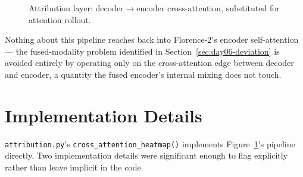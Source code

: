 \begin{figure}[h]
\centering
{}
\caption{Attribution layer: decoder$\to$encoder cross-attention, substituted for attention rollout.}
\label{fig:diagram-d}
\end{figure}

Nothing about this pipeline reaches back into Florence-2's encoder self-attention --- the
fused-modality problem identified in Section~\ref{sec:day06-deviation} is avoided entirely by
operating only on the cross-attention edge between decoder and encoder, a quantity the fused
encoder's internal mixing does not touch.

\section{Implementation Details}
\label{sec:day06-implementation}

\texttt{attribution.py}'s \texttt{cross\_attention\_heatmap()} implements
Figure~\ref{fig:diagram-d}'s pipeline directly. Two implementation details were significant enough
to flag explicitly rather than leave implicit in the code.

